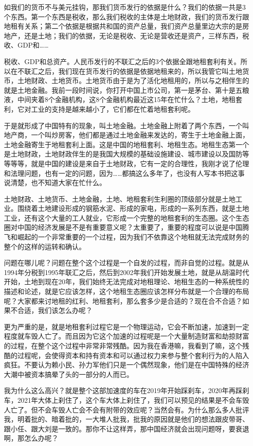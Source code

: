 \documentclass[UTF8, 12pt, a4paper]{ctexrep}
\begin{document}
如我们的货币不与美元挂钩，那我们货币发行的依据是什么？我们的依据一共是3个东西。第一个东西是税收，那么我们税收的主体是土地财政，我们的货币发行跟地租有关系；第二个依据是根据共和国的资产总量，我们资产总量里边大宗的是房地产，还是土地；我们的依据，无论是税收、无论是营收还是资产，三样东西，税收、GDP和……

税收、GDP和总资产。人民币发行的不联汇之后的3个依据全跟地租套利有关。所以在不联汇之后，我们现在货币发行的依据是依据地租来的，所以我管它叫土地货币，土地财政、土地货币。土地货币由于是为了活化地租用的，所以与之相伴生的就是土地金融。我前一段时间说，你打开中国上市公司，第一是茅台、第十是五粮液，中间夹着8个金融机构，这8个金融机构最近这15年在忙什么？土地，地租套利，它对工业的支持是越来越小了，它们都在忙着地租套利呢。

于是就形成了中国特有的现象，叫土地金融。土地金融上附着了两个东西，一个叫地产商，一个叫炒房客，他们都是通过土地金融来发达的，寄生于土地金融上面，土地金融寄生于地租套利上面。这是中国的地租套利、地租生态。地租生态第一个是土地财政，土地财政伴生的是我国大规模的基础设施建设、城市建设以及国防等等等等，就是中国的建设是来自于土地财政，它有一定的合理性，我刚才说了伦理和法理问题，也有一定的问题，因为……都搞这么多年了，也没有人写本书把这事说清楚，也不知道大家在忙什么。

土地财政、土地货币、土地金融，土地、地租套利生利圈的顶级部分就是土地工业。围绕着土地建设形成的钢筋水泥、形成的家电，形成的一系列东西，就是土地工业，还有这个大量的工人就业，它形成一个完整的地租套利的生态圈。这个生态圈对中国的经济发展是不是有重要意义呢？太重要了，重要的程度可以说是中国腾飞和崛起的一个非常重要的一个过程，因为我们不依靠这个地租就无法完成财务的整个的这样的运转和确认。

问题在哪儿呢？问题在整个这个过程是一个自发的过程，而非自觉的过程。就是从1994年分税到1995年联汇之后，然后到2002年我们开始发展土地，就是从胡温时代开始，土地到现在20年，我们始终无法完成对地租理论、地租生态的一种系统性的描述和论述，就是它应该怎样，这个地租生态圈应该怎样分布就是一个合理的布局呢？大家都来讨地租的红利、地租套利，那么套多少是合适的？现在合不合适？如果不合适，我们该怎么办呢？

更为严重的是，就是地租套利过程它是一个物理运动，它会不断加速，加速到一定程度就车毁人亡了。而且因为它这个加速的过程呢是一个大量制造财富和劫掠财富的过程，在整个这个过程中非常非常残酷。因为我在香港嘛，我看到了嘛，这个残酷的过程呢，会使得资本和持有资本和可以通过权力来参与整个套利行为的人陷入疯狂。不要认为赖小民、孙力军他们只是一个偶然现象，他们是在中国特殊的经济大潮中被资本搞晕了头的一部分的人而已。

我为什么这么高兴？就是整个这部加速度的车在2019年开始踩刹车，2020年再踩刹车，2021年大体上刹住了，这个车大体上刹住了，我们可以预见的结果是不会车毁人亡了。但不会车毁人亡会不会有附带的效应呢？当然会有。为什么那么多人批评我，明着批的、暗着批的，一大堆人批我，批我的原因就是他们的想法跟皮带哥、跟小任、跟大刘是一致的。那你不让这样弄，那中国经济就会出现问题呀，要衰退啊，那怎么办呢？
\end{document}
